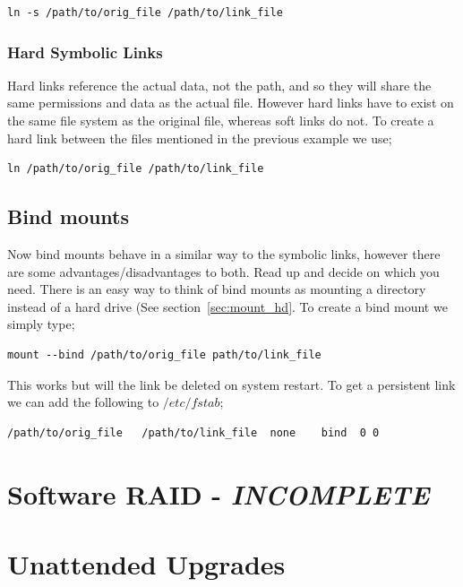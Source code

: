 \begin{lstlisting}
ln -s /path/to/orig_file /path/to/link_file
\end{lstlisting}


\subsubsection{Hard Symbolic Links}

Hard links reference the actual data, not the path, and so they will share the same permissions and data as the actual file. However hard links have to exist on the same file system as the original file, whereas soft links do not. To create a hard link between the files mentioned in the previous example we use;

\begin{lstlisting}
ln /path/to/orig_file /path/to/link_file
\end{lstlisting}

\subsection{Bind mounts}

Now bind mounts behave in a similar way to the symbolic links, however there are some advantages/disadvantages to both. Read up and decide on which you need. There is an easy way to think of bind mounts as mounting a directory instead of a hard drive (See section~\ref{sec:mount_hd}. To create a bind mount we simply type;

\begin{lstlisting}
mount --bind /path/to/orig_file path/to/link_file
\end{lstlisting}

This works but will the link be deleted on system restart. To get a persistent link we can add the following to $/etc/fstab$;

\begin{lstlisting}
/path/to/orig_file   /path/to/link_file  none    bind  0 0
\end{lstlisting}

\section{Software RAID - \textit{INCOMPLETE}}



\section{Unattended Upgrades}

